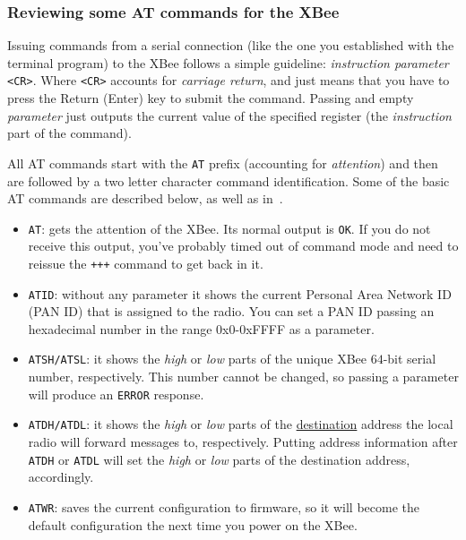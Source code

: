 \subsubsection{Reviewing some AT commands for the XBee}

Issuing commands from a serial connection (like the one you established with the terminal program) to the XBee follows a simple guideline: \emph{instruction parameter} \texttt{<CR>}. Where \texttt{<CR>} accounts for \emph{carriage return}, and just means that you have to press the Return (Enter) key to submit the command. Passing and empty \emph{parameter} just outputs the current value of the specified register (the \emph{instruction} part of the command).

All AT commands start with the \texttt{AT} prefix (accounting for \emph{attention}) and then are followed by a two letter character command identification. Some of the basic AT commands are described below, as well as in~\cite{faludi2010bws}.

\begin{itemize}
	\item \texttt{AT}: gets the attention of the XBee. Its normal output is \texttt{OK}. If you do not receive this output,  you've probably timed out of command mode and need to reissue the \texttt{+++} command to get back in it.
	\item \texttt{ATID}: without any parameter it shows the current Personal Area Network ID (PAN ID) that is assigned to the radio. You can set a PAN ID passing an hexadecimal number in the range $0$x$0$-$0$xFFFF as a parameter.
	\item \texttt{ATSH/ATSL}: it shows the \emph{high} or \emph{low} parts of the unique XBee $64$-bit serial number, respectively. This number cannot be changed, so passing a parameter will produce an \texttt{ERROR} response.
	\item \texttt{ATDH/ATDL}: it shows the \emph{high} or \emph{low} parts of the \underline{destination} address the local radio will forward messages to, respectively. Putting address information after \texttt{ATDH} or \texttt{ATDL} will set the \emph{high} or \emph{low} parts of the destination address, accordingly.
	\item \texttt{ATWR}: saves the current configuration to firmware, so it will become the default configuration the next time you power on the XBee.
\end{itemize}

		
